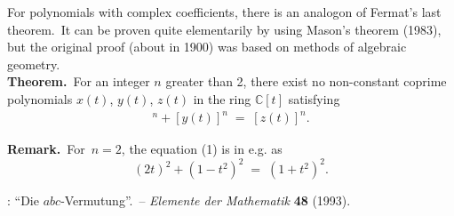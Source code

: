 \documentclass[12pt]{article}
\theoremstyle{definition}
\begin{document}
For polynomials with complex coefficients, there is an analogon of Fermat's last theorem.\, It can be proven quite elementarily by using Mason's theorem (1983), but the original proof (about in 1900) was based on methods of algebraic geometry.\\

\textbf{Theorem.}\, For an integer $n$ greater than 2, there exist no non-constant coprime polynomials $x(t)$, $y(t)$, 
$z(t)$ in the ring $\mathbb{C}[t]$ satisfying
\begin{align}
[x(t)]^n+[y(t)]^n \;=\; [z(t)]^n.
\end{align}


\textbf{Remark.}\, For\, $n = 2$, the equation (1) is in  e.g. as
$$(2t)^2\!+\!(1\!-\!t^2)^2 \;=\; (1\!+\!t^2)^2.$$



\begin{thebibliography}{8}
: ``Die $abc$-Vermutung''.\, -- \emph{Elemente der Mathematik} \textbf{48} (1993).
\end{thebibliography}




\end{document}
